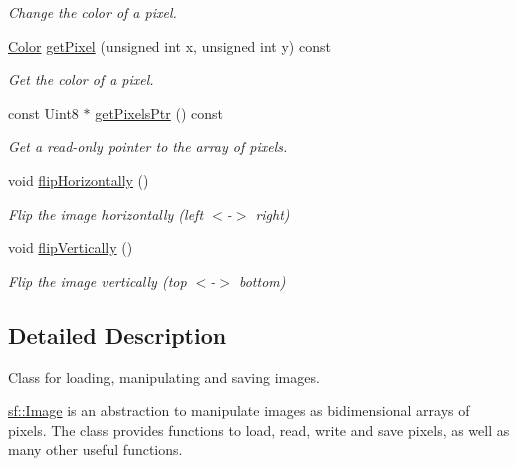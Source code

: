 \begin{DoxyCompactItemize}
\begin{DoxyCompactList}\small\item\em Change the color of a pixel. \end{DoxyCompactList}\item 
\hyperlink{classsf_1_1Color}{Color} \hyperlink{classsf_1_1Image_a8c8460e311dcb00557cb00a81c29163d}{get\-Pixel} (unsigned int x, unsigned int y) const 
\begin{DoxyCompactList}\small\item\em Get the color of a pixel. \end{DoxyCompactList}\item 
const Uint8 $\ast$ \hyperlink{classsf_1_1Image_ac6137a608a9efaae2735c13ff259c214}{get\-Pixels\-Ptr} () const 
\begin{DoxyCompactList}\small\item\em Get a read-\/only pointer to the array of pixels. \end{DoxyCompactList}\item 
\hypertarget{classsf_1_1Image_a57168e7bc29190e08bbd6c9c19f4bb2c}{void \hyperlink{classsf_1_1Image_a57168e7bc29190e08bbd6c9c19f4bb2c}{flip\-Horizontally} ()}\label{classsf_1_1Image_a57168e7bc29190e08bbd6c9c19f4bb2c}

\begin{DoxyCompactList}\small\item\em Flip the image horizontally (left $<$-\/$>$ right) \end{DoxyCompactList}\item 
\hypertarget{classsf_1_1Image_a78a702a7e49d1de2dec9894da99d279c}{void \hyperlink{classsf_1_1Image_a78a702a7e49d1de2dec9894da99d279c}{flip\-Vertically} ()}\label{classsf_1_1Image_a78a702a7e49d1de2dec9894da99d279c}

\begin{DoxyCompactList}\small\item\em Flip the image vertically (top $<$-\/$>$ bottom) \end{DoxyCompactList}\end{DoxyCompactItemize}


\subsection{Detailed Description}
Class for loading, manipulating and saving images. 

\hyperlink{classsf_1_1Image}{sf\-::\-Image} is an abstraction to manipulate images as bidimensional arrays of pixels. The class provides functions to load, read, write and save pixels, as well as many other useful functions.

